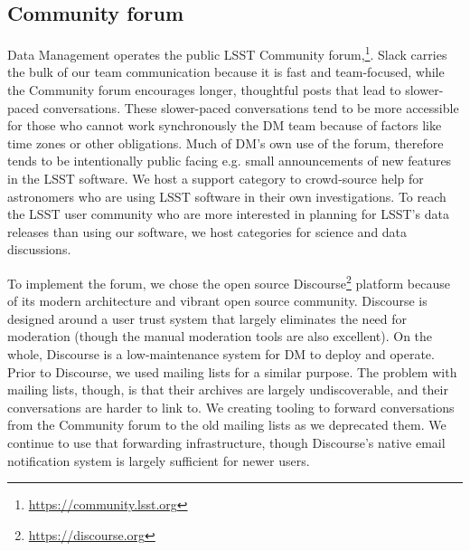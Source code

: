 \subsection{Community forum}
\label{sec:forum}

Data Management operates the public LSST Community forum,\footnote{\url{https://community.lsst.org}}.
Slack carries the bulk of our team communication because it is fast and team-focused, while
the Community forum  encourages longer, thoughtful posts that lead to slower-paced conversations.
These slower-paced conversations tend to be more accessible for those who cannot work synchronously the DM team because of factors like time zones or other obligations.
Much of DM's own use of the forum, therefore tends to be intentionally public facing e.g.
small announcements of new features in the LSST software.
We host a support category to crowd-source help for astronomers who are using LSST software in their own investigations.
To reach the LSST user community who are more interested in planning for LSST's data releases than using our software, we host categories for science and data discussions.

\noindent To implement the forum, we chose the open source Discourse\footnote{\url{https://discourse.org}} platform because of its modern architecture and vibrant open source community.
Discourse is designed around a user trust system that largely eliminates the need for moderation (though the manual moderation tools are also excellent).
On the whole, Discourse is a low-maintenance system for DM to deploy and operate.
Prior to Discourse, we used mailing lists for a similar purpose.
The problem with mailing lists, though, is that their archives are largely undiscoverable, and their conversations are harder to link to.
We creating tooling to forward conversations from the Community forum to the old mailing lists as we deprecated them.
We continue to use that forwarding infrastructure, though Discourse's native email notification system is largely sufficient for newer users.
